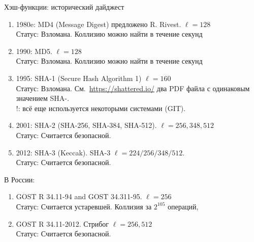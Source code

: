 \documentclass[usenames,dvipsnames,8pt,aspectratio=169]{beamer}
\begin{document}
\begin{frame}{Хэш-функции: исторический дайджест}
\large
	\begin{enumerate}
		\itemsep7pt
		\item 1980e: MD4 (Message Digest) предложено R. Rivest.  {\color{Orange} $\ell = 128$} \\
		Статус: {\color{Orange} Взломана.} Коллизию можно найти в течение секунд
		
		\item 1990: MD5. {\color{Orange} $\ell = 128$} \\
		Статус: {\color{Orange} Взломана.} Коллизию можно найти в течение секунд
		\pause
		\item 1995: SHA-1 (Secure Hash Algorithm 1) {\color{Orange} $\ell = 160$ } \\
		Статус: {\color{Orange} Взломана}. См.\ \url{https://shattered.io/} два PDF файла с одинаковым значением SHA-. \\
		{\color{Orange} !:} всё еще используется некоторыми системами (GIT).
		\pause
		\item 2001: SHA-2 (SHA-256, SHA-384, SHA-512). {\color{Orange} $\ell=256, 348, 512$} \\
		Статус: {\color{Orange} Считается безопасной.}
		\pause
		\item 2012: SHA-3 (Keccak). SHA-3 {\color{Orange} $\ell = 224/256/348/512$.} \\
		Статус: {\color{Orange} Считается безопасной.} 
	\end{enumerate}
\pause
В России:

	\begin{enumerate}
			\item GOST R 34.11-94 and GOST 34.311-95. {\color{Orange} $\ell = 256$} \\
			 Статус: {\color{Orange} Считается устаревшей.} Коллизия за $2^{105}$ операций,
			\item  GOST R 34.11-2012. Стрибог {\color{Orange} $\ell = 256, 512$} \\
			 Статус: {\color{Orange} Считается безопасной.}  
	\end{enumerate}
\end{frame}
\end{document}
